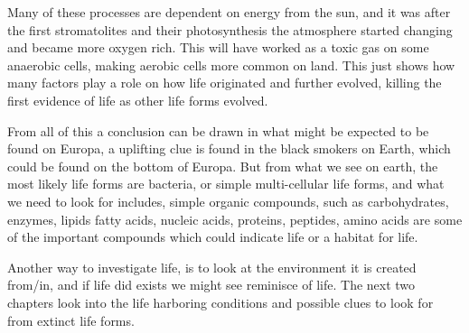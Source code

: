 Many of these processes are dependent on energy from the sun, and it was after the first stromatolites and their photosynthesis the atmosphere started changing and became more oxygen rich. This will have worked as a toxic gas on some anaerobic cells, making aerobic cells more common on land. This just shows how many factors play a role on how life originated and further evolved, killing the first evidence of life as other life forms evolved.\par
From all of this a conclusion can be drawn in what might be expected to be found on Europa, a uplifting clue is found in the black smokers on Earth, which could be found on the bottom of Europa. But from what we see on earth, the most likely life forms are bacteria, or simple multi-cellular life forms, and what we need to look for includes, simple organic compounds, such as carbohydrates, enzymes, lipids fatty acids, nucleic acids, proteins, peptides, amino acids are some of the important compounds which could indicate life or a habitat for life.\par  
Another way to investigate life, is to look at the environment it is created from/in, and if life did exists we might see reminisce of life. The next two chapters look into the life harboring conditions and possible clues to look for from extinct life forms. \par

